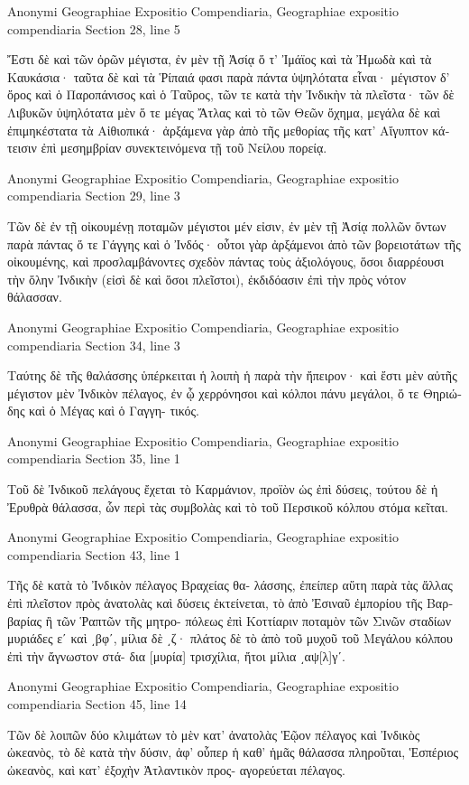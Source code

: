 \documentclass[12pt,letterpaper,twoside,final]{memoir}
\begin{document}
\begin{greek}
Anonymi Geographiae Expositio Compendiaria, Geographiae expositio compendiaria 
Section 28, line 5

Ἔστι δὲ καὶ τῶν ὀρῶν μέγιστα, ἐν μὲν τῇ 
Ἀσίᾳ ὅ τ' Ἰμάϊος καὶ τὰ Ἠμωδὰ καὶ τὰ Καυκάσια· 
ταῦτα δὲ καὶ τὰ Ῥίπαιά φασι παρὰ πάντα ὑψηλότατα 
εἶναι· μέγιστον δ' ὄρος καὶ ὁ Παροπάνισος καὶ ὁ 
Ταῦρος, τῶν τε κατὰ τὴν Ἰνδικὴν τὰ πλεῖστα· τῶν 
δὲ Λιβυκῶν ὑψηλότατα μὲν ὅ τε μέγας Ἄτλας καὶ τὸ 
τῶν Θεῶν ὄχημα, μεγάλα δὲ καὶ ἐπιμηκέστατα τὰ 
Αἰθιοπικά· ἀρξάμενα γὰρ ἀπὸ τῆς μεθορίας τῆς κατ' 
Αἴγυπτον κάτεισιν ἐπὶ μεσημβρίαν συνεκτεινόμενα τῇ 
τοῦ Νείλου πορείᾳ. 



Anonymi Geographiae Expositio Compendiaria, Geographiae expositio compendiaria 
Section 29, line 3

Τῶν δὲ ἐν τῇ οἰκουμένῃ ποταμῶν μέγιστοι μέν 
εἰσιν, ἐν μὲν τῇ Ἀσίᾳ πολλῶν ὄντων παρὰ πάντας ὅ 
τε Γάγγης καὶ ὁ Ἰνδός· οὗτοι γὰρ ἀρξάμενοι ἀπὸ τῶν 
βορειοτάτων τῆς οἰκουμένης, καὶ προσλαμβάνοντες 
σχεδὸν πάντας τοὺς ἀξιολόγους, ὅσοι διαρρέουσι τὴν 
ὅλην Ἰνδικὴν (εἰσὶ δὲ καὶ ὅσοι πλεῖστοι), ἐκδιδόασιν ἐπὶ 
τὴν πρὸς νότον θάλασσαν. 



Anonymi Geographiae Expositio Compendiaria, Geographiae expositio compendiaria 
Section 34, line 3

Ταύτης δὲ τῆς θαλάσσης ὑπέρκειται ἡ λοιπὴ 
ἡ παρὰ τὴν ἤπειρον· καὶ ἔστι μὲν αὐτῆς μέγιστον μὲν 
Ἰνδικὸν πέλαγος, ἐν ᾧ χερρόνησοι καὶ κόλποι πάνυ   
μεγάλοι, ὅ τε Θηριώδης καὶ ὁ Μέγας καὶ ὁ Γαγγη-
τικός. 



Anonymi Geographiae Expositio Compendiaria, Geographiae expositio compendiaria 
Section 35, line 1

Τοῦ δὲ Ἰνδικοῦ πελάγους ἔχεται τὸ Καρμάνιον, 
προϊὸν ὡς ἐπὶ δύσεις, τούτου δὲ ἡ Ἐρυθρὰ θάλασσα, 
ὧν περὶ τὰς συμβολὰς καὶ τὸ τοῦ Περσικοῦ κόλπου 
στόμα κεῖται. 



Anonymi Geographiae Expositio Compendiaria, Geographiae expositio compendiaria 
Section 43, line 1

Τῆς δὲ κατὰ τὸ Ἰνδικὸν πέλαγος Βραχείας θα-
λάσσης, ἐπείπερ αὕτη παρὰ τὰς ἄλλας ἐπὶ πλεῖστον 
πρὸς ἀνατολὰς καὶ δύσεις ἐκτείνεται, τὸ ἀπὸ Ἐσιναῦ 
ἐμπορίου τῆς Βαρβαρίας ἢ τῶν Ῥαπτῶν τῆς μητρο-
πόλεως ἐπὶ Κοττίαριν ποταμὸν τῶν Σινῶν σταδίων 
μυριάδες εʹ καὶ ͵βφʹ, μίλια δὲ ͵ζ· πλάτος δὲ τὸ ἀπὸ 
τοῦ μυχοῦ τοῦ Μεγάλου κόλπου ἐπὶ τὴν ἄγνωστον στά-
δια [μυρία] τρισχίλια, ἤτοι μίλια ͵αψ[λ]γʹ. 



Anonymi Geographiae Expositio Compendiaria, Geographiae expositio compendiaria 
Section 45, line 14

Τῶν δὲ λοιπῶν δύο κλιμάτων τὸ μὲν κατ' ἀνατολὰς 
Ἑῷον πέλαγος καὶ Ἰνδικὸς ὠκεανὸς, τὸ δὲ κατὰ τὴν 
δύσιν, ἀφ' οὗπερ ἡ καθ' ἡμᾶς θάλασσα πληροῦται, 
Ἑσπέριος ὠκεανὸς, καὶ κατ' ἐξοχὴν Ἀτλαντικὸν προς-
αγορεύεται πέλαγος. 

\end{greek}
\end{document}
